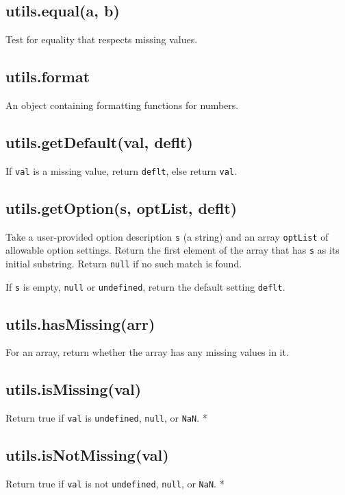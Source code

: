 \documentclass{article}
\begin{document}
    \subsection*{utils.equal(a, b)}
    Test for equality that respects missing values.


    \subsection*{utils.format}
    An object containing formatting functions for numbers.


    \subsection*{utils.getDefault(val, deflt)}
    If \texttt{val} is a missing value, return \texttt{deflt}, else return \texttt{val}.


    \subsection*{utils.getOption(s, optList, deflt)}
    Take a user-provided option description \texttt{s} (a string) and an array \texttt{optList}
of allowable option settings.  Return the first element of the array that
has \texttt{s} as its initial substring.  Return \texttt{null} if no such match is found.


If \texttt{s} is empty, \texttt{null} or \texttt{undefined}, return the default setting \texttt{deflt}.


    \subsection*{utils.hasMissing(arr)}
    For an array, return whether the array has any missing values in it.


    \subsection*{utils.isMissing(val)}
    Return true if \texttt{val} is \texttt{undefined}, \texttt{null}, or \texttt{NaN}. *


    \subsection*{utils.isNotMissing(val)}
    Return true if \texttt{val} is not \texttt{undefined}, \texttt{null}, or \texttt{NaN}. *
\end{document}
